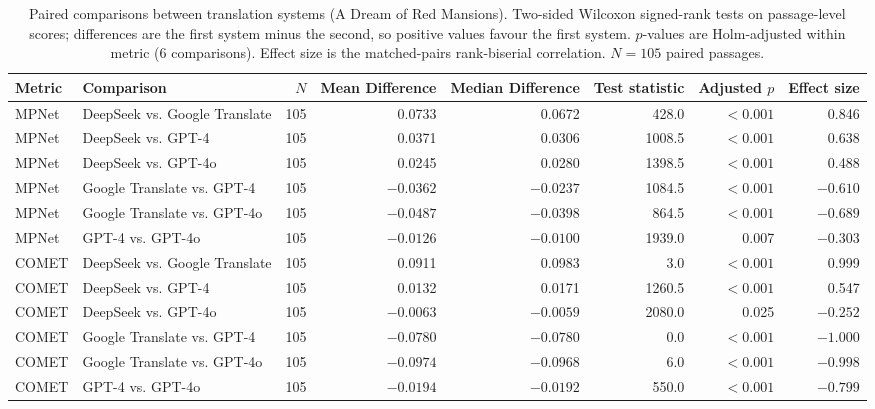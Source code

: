 \begin{table}[htbp]
\centering
\caption{Paired comparisons between translation systems (A Dream of Red Mansions). Two-sided Wilcoxon signed-rank tests on passage-level scores; differences are the first system minus the second, so positive values favour the first system. $p$-values are Holm-adjusted within metric (6 comparisons). Effect size is the matched-pairs rank-biserial correlation. $N=105$ paired passages.}
\label{tab:paired_tests_red_mansions}
\small
\begin{tabular}{llrrrrrr}
\hline
\textbf{Metric} & \textbf{Comparison} & \textbf{$N$} & \textbf{Mean Difference} & \textbf{Median Difference} & \textbf{Test statistic} & \textbf{Adjusted $p$} & \textbf{Effect size} \\
\hline
MPNet & DeepSeek vs. Google Translate & 105 & 0.0733 & 0.0672 & 428.0 & $<0.001$ & 0.846 \\
MPNet & DeepSeek vs. GPT-4 & 105 & 0.0371 & 0.0306 & 1008.5 & $<0.001$ & 0.638 \\
MPNet & DeepSeek vs. GPT-4o & 105 & 0.0245 & 0.0280 & 1398.5 & $<0.001$ & 0.488 \\
MPNet & Google Translate vs. GPT-4 & 105 & $-0.0362$ & $-0.0237$ & 1084.5 & $<0.001$ & $-0.610$ \\
MPNet & Google Translate vs. GPT-4o & 105 & $-0.0487$ & $-0.0398$ & 864.5 & $<0.001$ & $-0.689$ \\
MPNet & GPT-4 vs. GPT-4o & 105 & $-0.0126$ & $-0.0100$ & 1939.0 & 0.007 & $-0.303$ \\
COMET & DeepSeek vs. Google Translate & 105 & 0.0911 & 0.0983 & 3.0 & $<0.001$ & 0.999 \\
COMET & DeepSeek vs. GPT-4 & 105 & 0.0132 & 0.0171 & 1260.5 & $<0.001$ & 0.547 \\
COMET & DeepSeek vs. GPT-4o & 105 & $-0.0063$ & $-0.0059$ & 2080.0 & 0.025 & $-0.252$ \\
COMET & Google Translate vs. GPT-4 & 105 & $-0.0780$ & $-0.0780$ & 0.0 & $<0.001$ & $-1.000$ \\
COMET & Google Translate vs. GPT-4o & 105 & $-0.0974$ & $-0.0968$ & 6.0 & $<0.001$ & $-0.998$ \\
COMET & GPT-4 vs. GPT-4o & 105 & $-0.0194$ & $-0.0192$ & 550.0 & $<0.001$ & $-0.799$ \\
\hline
\end{tabular}
\end{table}
